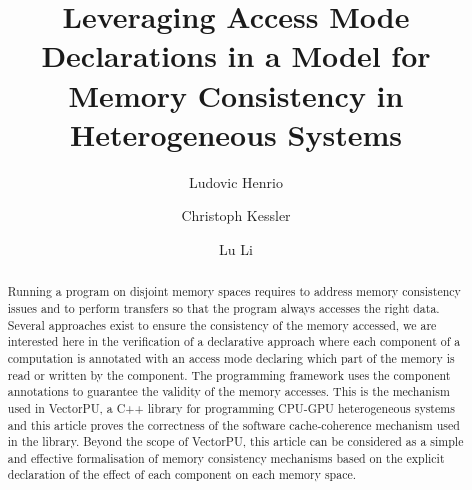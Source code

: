 \documentclass[preprint,12pt]{elsarticle}
\begin{document}
\begin{frontmatter}


\title{Leveraging Access Mode 
Declarations in a Model for Memory Consistency in Heterogeneous Systems }


\author[i3s]{Ludovic Henrio}
\author[liu]{Christoph Kessler}
\author[liu]{Lu Li}

\address[i3s]{Universit\'e~C\^ote~d'Azur, CNRS, I3S, France.}
\address[liu]{University of Linköping, Sweden}

\begin{abstract}
Running a program on disjoint memory spaces requires to address memory consistency 
issues and to perform  transfers so that the program always accesses  the right 
data. Several approaches exist to ensure the consistency of the memory accessed,  we 
are interested here in the verification of a declarative approach where each component of 
a computation is annotated with an access mode declaring which part of the memory is 
read or written by the component. The programming framework uses the component
annotations to guarantee the validity of the memory accesses. This is the mechanism used in VectorPU, a C++ library for programming CPU-GPU heterogeneous  systems 
and this article proves the correctness of the software cache-coherence mechanism used in 
the library. Beyond the scope of VectorPU, this article can be considered as a simple 
and effective formalisation of memory consistency mechanisms based on the explicit 
declaration of the effect of each component on each memory space.


\end{abstract}
\end{frontmatter}
\end{document}

